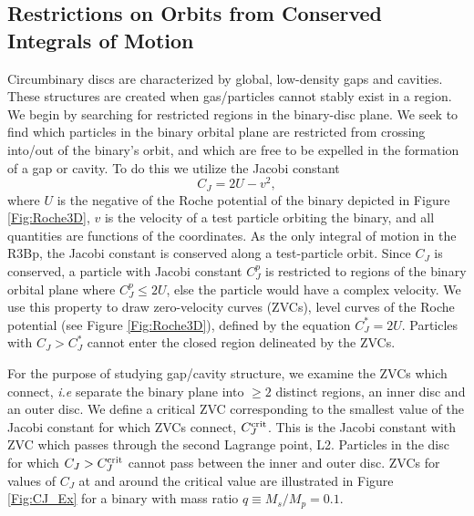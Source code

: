\documentclass[usenatbib]{mnras}
\begin{document}
\subsection{Restrictions on Orbits from Conserved Integrals of Motion}
\label{Stability Analysis}
Circumbinary discs are characterized by global, low-density 
gaps and cavities. These structures are created
when gas/particles cannot stably exist in a region. We begin by
searching for restricted regions in the binary-disc plane. We seek to
find which particles in the binary orbital plane are restricted from
crossing into/out of the binary's orbit, and which are free to be
expelled in the formation of a gap or cavity. To do this we utilize
the Jacobi constant
\begin{equation}
C_J = 2U - v^2, 
\label{Eq:CJ}
\end{equation}
where $U$ is the negative of the Roche potential of the binary depicted in
Figure \ref{Fig:Roche3D}, $v$ is the velocity of a test particle orbiting the binary, and
all quantities are functions of the coordinates. As the only integral
of motion in the R3Bp, the Jacobi constant is conserved along a
test-particle orbit. Since $C_J$ is conserved, a particle with Jacobi
constant $C^p_J$ is restricted to regions of the binary orbital plane
where $C^p_J \leq 2U$, else the particle would have a complex
velocity. We use this property to draw zero-velocity curves (ZVCs),
level curves of the Roche potential (see Figure \ref{Fig:Roche3D}), defined
by the equation $C^*_J = 2U$. Particles with $C_J > C^*_J$ cannot
enter the closed region delineated by the ZVCs.

For the purpose of studying gap/cavity structure, we examine the ZVCs
which connect, \textit{i.e} separate the binary plane into $\geq 2$
distinct regions, an inner disc and an outer disc. We define a
critical ZVC corresponding to the smallest value of the Jacobi
constant for which ZVCs connect, $C^{\rm{crit}}_J$. This is the Jacobi
constant with ZVC which passes through the second Lagrange point,
L2. Particles in the disc for which $C_J > C^{\rm{crit}}_J$ cannot
pass between the inner and outer disc.  ZVCs for values of $C_J$ at
and around the critical value are illustrated in Figure
\ref{Fig:CJ_Ex} for a binary with mass ratio $q\equiv M_s/M_p
=0.1$.
\end{document}
